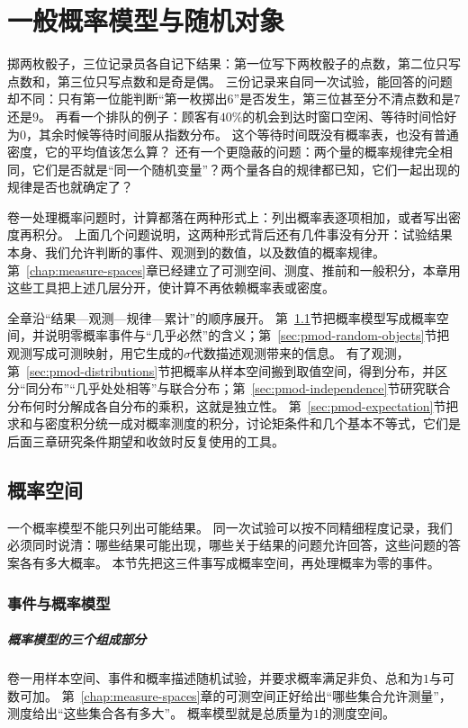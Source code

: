 \chapter{一般概率模型与随机对象}
\label{chap:probability-models}

掷两枚骰子，三位记录员各自记下结果：第一位写下两枚骰子的点数，第二位只写点数和，第三位只写点数和是奇是偶。
三份记录来自同一次试验，能回答的问题却不同：只有第一位能判断“第一枚掷出$6$”是否发生，第三位甚至分不清点数和是$7$还是$9$。
再看一个排队的例子：顾客有$40\%$的机会到达时窗口空闲、等待时间恰好为$0$，其余时候等待时间服从指数分布。
这个等待时间既没有概率表，也没有普通密度，它的平均值该怎么算？
还有一个更隐蔽的问题：两个量的概率规律完全相同，它们是否就是“同一个随机变量”？两个量各自的规律都已知，它们一起出现的规律是否也就确定了？

卷一处理概率问题时，计算都落在两种形式上：列出概率表逐项相加，或者写出密度再积分。
上面几个问题说明，这两种形式背后还有几件事没有分开：试验结果本身、我们允许判断的事件、观测到的数值，以及数值的概率规律。
第~\ref{chap:measure-spaces}章已经建立了可测空间、测度、推前和一般积分，本章用这些工具把上述几层分开，使计算不再依赖概率表或密度。

全章沿“结果—观测—规律—累计”的顺序展开。
第~\ref{sec:pmod-probability-space}节把概率模型写成概率空间，并说明零概率事件与“几乎必然”的含义；第~\ref{sec:pmod-random-objects}节把观测写成可测映射，用它生成的$\sigma$代数描述观测带来的信息。
有了观测，第~\ref{sec:pmod-distributions}节把概率从样本空间搬到取值空间，得到分布，并区分“同分布”“几乎处处相等”与联合分布；第~\ref{sec:pmod-independence}节研究联合分布何时分解成各自分布的乘积，这就是独立性。
第~\ref{sec:pmod-expectation}节把求和与密度积分统一成对概率测度的积分，讨论矩条件和几个基本不等式，它们是后面三章研究条件期望和收敛时反复使用的工具。

\section{概率空间}
\label{sec:pmod-probability-space}

一个概率模型不能只列出可能结果。
同一次试验可以按不同精细程度记录，我们必须同时说清：哪些结果可能出现，哪些关于结果的问题允许回答，这些问题的答案各有多大概率。
本节先把这三件事写成概率空间，再处理概率为零的事件。

\subsection{事件与概率模型}

\paragraph{概率模型的三个组成部分}
卷一用样本空间、事件和概率描述随机试验，并要求概率满足非负、总和为$1$与可数可加。
第~\ref{chap:measure-spaces}章的可测空间正好给出“哪些集合允许测量”，测度给出“这些集合各有多大”。
概率模型就是总质量为$1$的测度空间。

